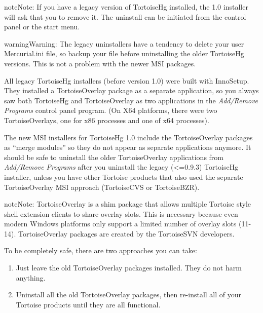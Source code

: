 \documentclass[letterpaper,10pt,english]{manual}
\begin{document}
\begin{notice}{note}{Note:}
If you have a legacy version of TortoiseHg installed, the 1.0
installer will ask that you to remove it.  The uninstall can be
initiated from the control panel or the start menu.
\end{notice}

\begin{notice}{warning}{Warning:}
The legacy uninstallers have a tendency to delete your user
Mercurial.ini file, so backup your file before uninstalling the
older TortoiseHg versions.  This is not a problem with the newer MSI
packages.
\end{notice}

All legacy TortoiseHg installers (before version 1.0) were built with
InnoSetup.  They installed a TortoiseOverlay package as a separate
application, so you always saw both TortoiseHg and TortoiseOverlay as
two applications in the \emph{Add/Remove Programs} control panel program.
(On X64 platforms, there were two TortoiseOverlays, one for x86
processes and one of x64 processes).

The new MSI installers for TortoiseHg 1.0 include the TortoiseOverlay
packages as ``merge modules'' so they do not appear as separate
applications anymore.  It should be safe to uninstall the older
TortoiseOverlay applications from \emph{Add/Remove Programs} after you
uninstall the legacy (\textless{}=0.9.3) TortoiseHg installer, unless you have
other Tortoise products that also used the separate TortoiseOverlay MSI
approach (TortoiseCVS or TortoiseBZR).

\begin{notice}{note}{Note:}
TortoiseOverlay is a shim package that allows multiple Tortoise
style shell extension clients to share overlay slots.  This is
necessary because even modern Windows platforms only support a
limited number of overlay slots (11-14).  TortoiseOverlay
packages are created by the TortoiseSVN developers.
\end{notice}

To be completely safe, there are two approaches you can take:
\begin{enumerate}
\item {} 
Just leave the old TortoiseOverlay packages installed.  They do not
harm anything.

\item {} 
Uninstall all the old TortoiseOverlay packages, then re-install all
of your Tortoise products until they are all functional.

\end{enumerate}
\end{document}
